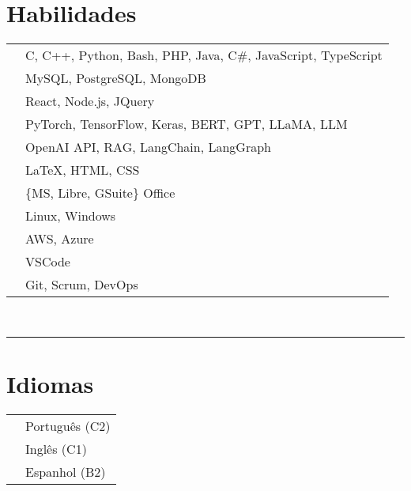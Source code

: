 \documentclass[oneside]{article}
\begin{document}
{\begin{minipage}[t][\textheight-2\fboxsep-2\fboxrule][t]{\dimexpr0.40\textwidth-2\fboxrule-2\fboxsep\relax}
        \section*{\large Habilidades}
        \begin{tabularx}{\textwidth}{cY}
           \faCode{}             & C, C++, Python, Bash, PHP, Java, C\#, JavaScript, TypeScript \\
            \faDatabase{}         & MySQL, PostgreSQL, MongoDB \\
            \faProjectDiagram{}   & React, Node.js, JQuery \\
            \faBrain{}            & PyTorch, TensorFlow, Keras, BERT, GPT, LLaMA, LLM \\
            \faNetworkWired{}     & OpenAI API, RAG, LangChain, LangGraph \\
            \faPenNib{}           & \LaTeX, HTML, CSS \\
            \faFont{}             & \{MS, Libre, GSuite\} Office \\
            \faCogs{}             & Linux, Windows \\
            \faCloud{}            & AWS, Azure \\
            \faLaptopCode{}       & VSCode \\
            \faTools{}            & Git, Scrum, DevOps \\
        \end{tabularx}
        \vspace{1pt} \\
        \rule{\linewidth}{0.4pt}
        \section*{\large Idiomas}
        \begin{tabular}{cl}
            \faLanguage{} & Português (C2) \\
            \faLanguage{} & Inglês (C1) \\
            \faLanguage{} & Espanhol (B2) 
        \end{tabular}
        \\

    \end{minipage}
}
\end{document}

